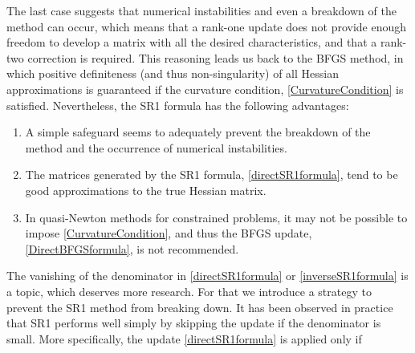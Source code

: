 The last case suggests that numerical instabilities and even a breakdown of the method can occur, which means that a rank-one update does not provide enough freedom to develop a matrix with all the desired characteristics, and that a rank-two correction is required. This reasoning leads us back to the BFGS method, in which positive definiteness (and thus non-singularity) of all Hessian approximations is guaranteed if the curvature condition, \cref{CurvatureCondition} is satisfied. Nevertheless, the SR1 formula has the following advantages:
\begin{enumerate}
    \item A simple safeguard seems to adequately prevent the breakdown of the method and the occurrence of numerical instabilities.
    \item The matrices generated by the SR1 formula, \cref{directSR1formula}, tend to be good approximations to the true Hessian matrix.
    \item In quasi-Newton methods for constrained problems, it may not be possible to impose \cref{CurvatureCondition}, and thus the BFGS update, \cref{DirectBFGSformula}, is not recommended. 
\end{enumerate}
The vanishing of the denominator in \cref{directSR1formula} or \cref{inverseSR1formula} is a topic, which deserves more research. For that we introduce a strategy to prevent the SR1 method from breaking down. It has been observed in practice that SR1 performs well simply by skipping the update if the denominator is small. More specifically, the update \cref{directSR1formula} is applied only if 

